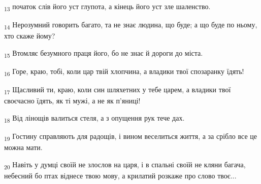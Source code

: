 \begin{tcolorbox}
\textsubscript{13} початок слів його уст глупота, а кінець його уст зле шаленство.
\end{tcolorbox}
\begin{tcolorbox}
\textsubscript{14} Нерозумний говорить багато, та не знає людина, що буде; а що буде по ньому, хто скаже йому?
\end{tcolorbox}
\begin{tcolorbox}
\textsubscript{15} Втомляє безумного праця його, бо не знає й дороги до міста.
\end{tcolorbox}
\begin{tcolorbox}
\textsubscript{16} Горе, краю, тобі, коли цар твій хлопчина, а владики твої спозаранку їдять!
\end{tcolorbox}
\begin{tcolorbox}
\textsubscript{17} Щасливий ти, краю, коли син шляхетних у тебе царем, а владики твої своєчасно їдять, як ті мужі, а не як п'яниці!
\end{tcolorbox}
\begin{tcolorbox}
\textsubscript{18} Від лінощів валиться стеля, а з опущення рук тече дах.
\end{tcolorbox}
\begin{tcolorbox}
\textsubscript{19} Гостину справляють для радощів, і вином веселиться життя, а за срібло все це можна мати.
\end{tcolorbox}
\begin{tcolorbox}
\textsubscript{20} Навіть у думці своїй не злослов на царя, і в спальні своїй не кляни багача, небесний бо птах віднесе твою мову, а крилатий розкаже про слово твоє...
\end{tcolorbox}
